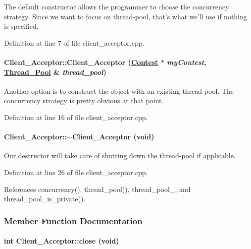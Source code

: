 The default constructor allows the programmer to choose the concurrency strategy. Since we want to focus on thread-pool, that's what we'll use if nothing is specified. 

Definition at line 7 of file client\_\-acceptor.cpp.\hypertarget{classClient__Acceptor_Client__Acceptora1}{
\paragraph[Client\_\-Acceptor]{\setlength{\rightskip}{0pt plus 5cm}Client\_\-Acceptor::Client\_\-Acceptor (\hyperlink{classContest}{Contest} $\ast$ {\em my\-Contest}, \hyperlink{classThread__Pool}{Thread\_\-Pool} \& {\em thread\_\-pool})}\hfill}
\label{classClient__Acceptor_Client__Acceptora1}


Another option is to construct the object with an existing thread pool. The concurrency strategy is pretty obvious at that point. 

Definition at line 16 of file client\_\-acceptor.cpp.\hypertarget{classClient__Acceptor_Client__Acceptora2}{
\paragraph[$\sim$Client\_\-Acceptor]{\setlength{\rightskip}{0pt plus 5cm}Client\_\-Acceptor::$\sim$Client\_\-Acceptor (void)}\hfill}
\label{classClient__Acceptor_Client__Acceptora2}


Our destructor will take care of shutting down the thread-pool if applicable. 

Definition at line 26 of file client\_\-acceptor.cpp.

References concurrency(), thread\_\-pool(), thread\_\-pool\_\-, and thread\_\-pool\_\-is\_\-private().

\subsubsection{Member Function Documentation}
\hypertarget{classClient__Acceptor_Client__Acceptora4}{
\paragraph[close]{\setlength{\rightskip}{0pt plus 5cm}int Client\_\-Acceptor::close (void)}\hfill}
\label{classClient__Acceptor_Client__Acceptora4}


